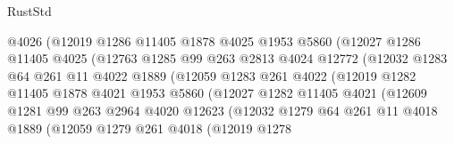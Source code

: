 \begin{lexlean}{RustStd}
\begin{coremodule}
                          @4026
                          (@12019
                            @1286
                            @11405
                            @1878
                            @4025
                            @1953
                            @5860
                            (@12027
                              @1286
                              @11405
                              @4025
                              (@12763
                                @1285
                                @99
                                @263
                                @2813
                                @4024
                                @12772
                                (@12032
                                  @1283
                                  @64
                                  @261
                                  @11
                                  @4022
                                  @1889
                                  (@12059
                                    @1283
                                    @261
                                    @4022
                                    (@12019
                                      @1282
                                      @11405
                                      @1878
                                      @4021
                                      @1953
                                      @5860
                                      (@12027
                                        @1282
                                        @11405
                                        @4021
                                        (@12609
                                          @1281
                                          @99
                                          @263
                                          @2964
                                          @4020
                                          @12623
                                          (@12032
                                            @1279
                                            @64
                                            @261
                                            @11
                                            @4018
                                            @1889
                                            (@12059
                                              @1279
                                              @261
                                              @4018
                                              (@12019
                                                @1278

\end{coremodule}
\end{lexlean}
